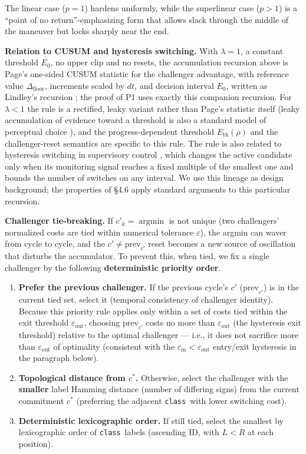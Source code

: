\documentclass[11pt]{article}
\newcommand{\Class}{\texttt{class}}
\newcommand{\Dfloor}{\Delta_{\text{floor}}}
\newcommand{\Eth}{E_{\text{th}}}
\begin{document}
The linear case ($p=1$) hardens uniformly, while the superlinear case ($p>1$) is a ``point of no return''-emphasizing form that allows slack through the middle of the maneuver but locks sharply near the end.

\textbf{Relation to CUSUM and hysteresis switching.} With $\lambda=1$, a constant threshold $E_0$, no upper clip and no resets, the accumulation recursion above is Page's one-sided CUSUM statistic \cite{page1954cusum} for the challenger advantage, with reference value $\Dfloor$, increments scaled by $dt$, and decision interval $E_0$, written as Lindley's recursion \cite{lindley1952queue}; the proof of P1 uses exactly this companion recursion. For $\lambda<1$ the rule is a rectified, leaky variant rather than Page's statistic itself (leaky accumulation of evidence toward a threshold is also a standard model of perceptual choice \cite{usher2001lca}), and the progress-dependent threshold $\Eth(\rho)$ and the challenger-reset semantics are specific to this rule. The rule is also related to hysteresis switching in supervisory control \cite{hespanha2003hysteresis}, which changes the active candidate only when its monitoring signal reaches a fixed multiple of the smallest one and bounds the number of switches on any interval. We use this lineage as design background; the properties of \S4.6 apply standard arguments to this particular recursion.

\textbf{Challenger tie-breaking.} If $c'_k = \operatorname*{argmin}$ is not unique (two challengers' normalized costs are tied within numerical tolerance $\varepsilon$), the argmin can waver from cycle to cycle, and the $c' \ne \text{prev}_{c'}$ reset becomes a new source of oscillation that disturbs the accumulator. To prevent this, when tied, we fix a single challenger by the following \textbf{deterministic priority order}.

\begin{enumerate}
\item \textbf{Prefer the previous challenger.} If the previous cycle's $c'$ ($\text{prev}_{c'}$) is in the current tied set, select it (temporal consistency of challenger identity). Because this priority rule applies only within a set of costs tied within the exit threshold $\varepsilon_{\text{out}}$, choosing $\text{prev}_{c'}$ costs no more than $\varepsilon_{\text{out}}$ (the hysteresis exit threshold) relative to the optimal challenger --- i.e., it does not sacrifice more than $\varepsilon_{\text{out}}$ of optimality (consistent with the $\varepsilon_{\text{in}} < \varepsilon_{\text{out}}$ entry/exit hysteresis in the paragraph below).
\item \textbf{Topological distance from $c^*$.} Otherwise, select the challenger with the \textbf{smaller} label Hamming distance (number of differing signs) from the current commitment $c^*$ (preferring the adjacent \Class\ with lower switching cost).
\item \textbf{Deterministic lexicographic order.} If still tied, select the smallest by lexicographic order of \Class\ labels (ascending ID, with $L < R$ at each position).
\end{enumerate}
\end{document}
